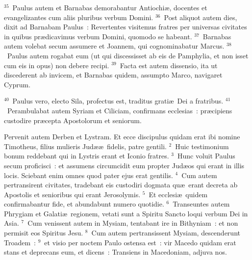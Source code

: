 ${}^{35}$~Paulus autem et Barnabas demorabantur Antiochi\ae , docentes et evangelizantes cum aliis pluribus verbum Domini.
${}^{36}$~Post aliquot autem dies, dixit ad Barnabam Paulus~: Revertentes visitemus fratres per universas civitates in quibus pr\ae dicavimus verbum Domini, quomodo se habeant.
${}^{37}$~Barnabas autem volebat secum assumere et Joannem, qui cognominabatur Marcus.
${}^{38}$~Paulus autem rogabat eum (ut qui discessisset ab eis de Pamphylia, et non isset cum eis in opus) non debere recipi.
${}^{39}$~Facta est autem dissensio, ita ut discederent ab invicem, et Barnabas quidem, assumpto Marco, navigaret Cyprum.


${}^{40}$~Paulus vero, electo Sila, profectus est, traditus grati\ae\ Dei a fratribus.
${}^{41}$~Perambulabat autem Syriam et Ciliciam, confirmans ecclesias~: pr\ae cipiens custodire pr\ae cepta Apostolorum et seniorum.

\lettrine[lines=3,image=true,loversize=0.05,lraise=-0.03]{P}{}ervenit autem Derben et Lystram. Et ecce discipulus quidam erat ibi nomine Timotheus, filius mulieris Jud\ae \ae\ fidelis, patre gentili.
${}^{2}$~Huic testimonium bonum reddebant qui in Lystris erant et Iconio fratres.
${}^{3}$~Hunc voluit Paulus secum proficisci~: et assumens circumcidit eum propter Jud\ae os qui erant in illis locis. Sciebant enim omnes quod pater ejus erat gentilis.
${}^{4}$~Cum autem pertransirent civitates, tradebant eis custodiri dogmata qu\ae\ erant decreta ab Apostolis et senioribus qui erant Jerosolymis.
${}^{5}$~Et ecclesi\ae\ quidem confirmabantur fide, et abundabunt numero quotidie.
${}^{6}$~Transeuntes autem Phrygiam et Galati\ae\ regionem, vetati sunt a Spiritu Sancto loqui verbum Dei in Asia.
${}^{7}$~Cum venissent autem in Mysiam, tentabant ire in Bithyniam~: et non permisit eos Spiritus Jesu.
${}^{8}$~Cum autem pertransissent Mysiam, descenderunt Troadem~:
${}^{9}$~et visio per noctem Paulo ostensa est~: vir Macedo quidam erat stans et deprecans eum, et dicens~: Transiens in Macedoniam, adjuva nos.


